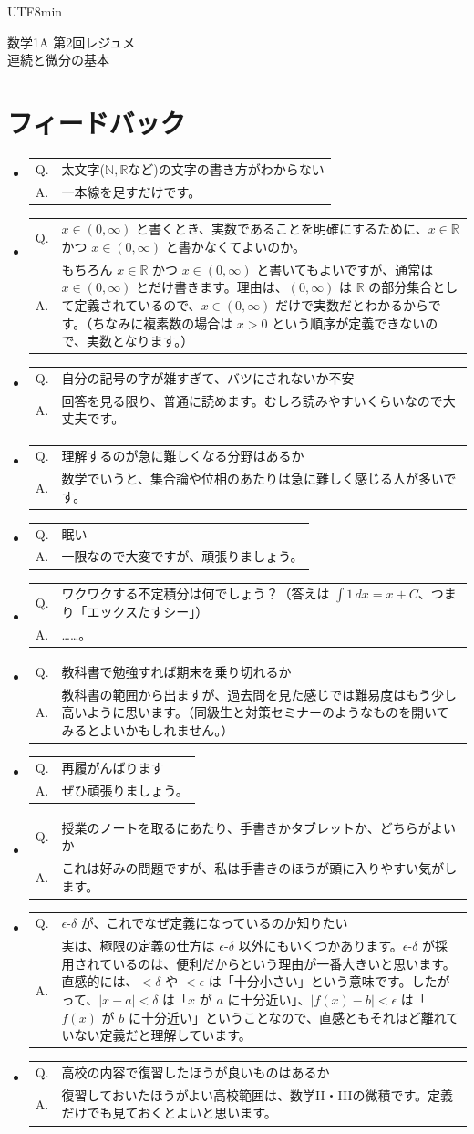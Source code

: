 \documentclass[a4paper,12pt]{article}
\makeatletter
\newcommand{\feedbackqa}[2]{%
\item[]
\begin{tabular}[t]{@{}p{1.8em}@{\hspace{0.4em}}p{\dimexpr\linewidth-2.2em\relax}@{}}
Q. & #1 \\
A. & #2
\end{tabular}
\par\smallskip\hrulefill
}
\makeatother
\begin{document}
\ifPDFTeX
\begin{CJK}{UTF8}{min}
\fi
\theoremstyle{definition}
\newtheorem*{definition}{定義}
\newtheorem*{theorem}{定理}

\begin{center}
{\LARGE 数学1A 第2回レジュメ}\\[0.4em]
連続と微分の基本
\end{center}
\section*{フィードバック}

\begin{itemize}[leftmargin=1.5em,itemsep=0.7em,topsep=0.3em]
\feedbackqa{太文字($\mathbb N,\mathbb R$など)の文字の書き方がわからない}{一本線を足すだけです。}
\feedbackqa{$x\in (0,\infty)$ と書くとき、実数であることを明確にするために、$x \in \mathbb{R}$ かつ $x\in (0,\infty)$ と書かなくてよいのか。}{もちろん $x\in \mathbb{R}$ かつ $x\in (0,\infty)$ と書いてもよいですが、通常は $x\in (0,\infty)$ とだけ書きます。理由は、$(0,\infty)$ は $\mathbb{R}$ の部分集合として定義されているので、$x\in (0,\infty)$ だけで実数だとわかるからです。（ちなみに複素数の場合は $x>0$ という順序が定義できないので、実数となります。）}
\feedbackqa{自分の記号の字が雑すぎて、バツにされないか不安}{回答を見る限り、普通に読めます。むしろ読みやすいくらいなので大丈夫です。}
\feedbackqa{理解するのが急に難しくなる分野はあるか}{数学でいうと、集合論や位相のあたりは急に難しく感じる人が多いです。}
\feedbackqa{眠い}{一限なので大変ですが、頑張りましょう。}
\feedbackqa{ワクワクする不定積分は何でしょう？（答えは $\int 1\,dx = x+C$、つまり「エックスたすシー」）}{……。}
\feedbackqa{教科書で勉強すれば期末を乗り切れるか}{教科書の範囲から出ますが、過去問を見た感じでは難易度はもう少し高いように思います。（同級生と対策セミナーのようなものを開いてみるとよいかもしれません。）}
\feedbackqa{再履がんばります}{ぜひ頑張りましょう。}
\feedbackqa{授業のノートを取るにあたり、手書きかタブレットか、どちらがよいか}{これは好みの問題ですが、私は手書きのほうが頭に入りやすい気がします。}
\feedbackqa{$\epsilon$-$\delta$ が、これでなぜ定義になっているのか知りたい}{実は、極限の定義の仕方は $\epsilon$-$\delta$ 以外にもいくつかあります。$\epsilon$-$\delta$ が採用されているのは、便利だからという理由が一番大きいと思います。直感的には、$<\delta$ や $<\epsilon$ は「十分小さい」という意味です。したがって、$|x-a|<\delta$ は「$x$ が $a$ に十分近い」、$|f(x)-b|<\epsilon$ は「$f(x)$ が $b$ に十分近い」ということなので、直感ともそれほど離れていない定義だと理解しています。}
\feedbackqa{高校の内容で復習したほうが良いものはあるか}{復習しておいたほうがよい高校範囲は、数学II・IIIの微積です。定義だけでも見ておくとよいと思います。}

\end{itemize}
\end{CJK}
\end{document}
